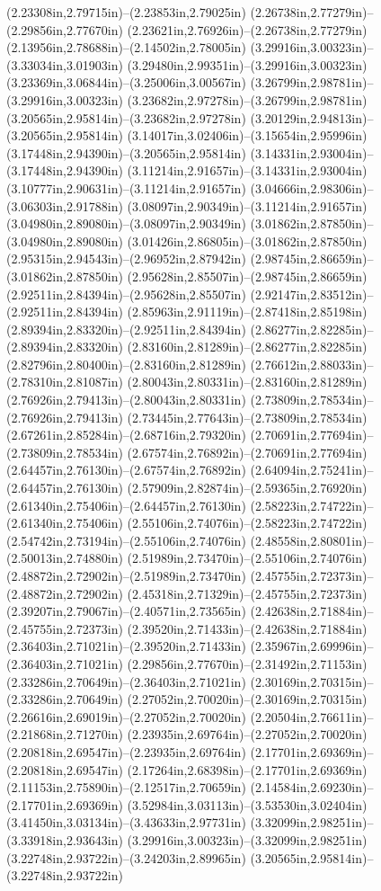 (2.23308in,2.79715in)--(2.23853in,2.79025in) (2.26738in,2.77279in)--(2.29856in,2.77670in) (2.23621in,2.76926in)--(2.26738in,2.77279in) (2.13956in,2.78688in)--(2.14502in,2.78005in) (3.29916in,3.00323in)--(3.33034in,3.01903in) (3.29480in,2.99351in)--(3.29916in,3.00323in) (3.23369in,3.06844in)--(3.25006in,3.00567in) (3.26799in,2.98781in)--(3.29916in,3.00323in) (3.23682in,2.97278in)--(3.26799in,2.98781in) (3.20565in,2.95814in)--(3.23682in,2.97278in) (3.20129in,2.94813in)--(3.20565in,2.95814in) (3.14017in,3.02406in)--(3.15654in,2.95996in) (3.17448in,2.94390in)--(3.20565in,2.95814in) (3.14331in,2.93004in)--(3.17448in,2.94390in) (3.11214in,2.91657in)--(3.14331in,2.93004in) (3.10777in,2.90631in)--(3.11214in,2.91657in) (3.04666in,2.98306in)--(3.06303in,2.91788in) (3.08097in,2.90349in)--(3.11214in,2.91657in) (3.04980in,2.89080in)--(3.08097in,2.90349in) (3.01862in,2.87850in)--(3.04980in,2.89080in) (3.01426in,2.86805in)--(3.01862in,2.87850in) (2.95315in,2.94543in)--(2.96952in,2.87942in) (2.98745in,2.86659in)--(3.01862in,2.87850in) (2.95628in,2.85507in)--(2.98745in,2.86659in) (2.92511in,2.84394in)--(2.95628in,2.85507in) (2.92147in,2.83512in)--(2.92511in,2.84394in) (2.85963in,2.91119in)--(2.87418in,2.85198in) (2.89394in,2.83320in)--(2.92511in,2.84394in) (2.86277in,2.82285in)--(2.89394in,2.83320in) (2.83160in,2.81289in)--(2.86277in,2.82285in) (2.82796in,2.80400in)--(2.83160in,2.81289in) (2.76612in,2.88033in)--(2.78310in,2.81087in) (2.80043in,2.80331in)--(2.83160in,2.81289in) (2.76926in,2.79413in)--(2.80043in,2.80331in) (2.73809in,2.78534in)--(2.76926in,2.79413in) (2.73445in,2.77643in)--(2.73809in,2.78534in) (2.67261in,2.85284in)--(2.68716in,2.79320in) (2.70691in,2.77694in)--(2.73809in,2.78534in) (2.67574in,2.76892in)--(2.70691in,2.77694in) (2.64457in,2.76130in)--(2.67574in,2.76892in) (2.64094in,2.75241in)--(2.64457in,2.76130in) (2.57909in,2.82874in)--(2.59365in,2.76920in) (2.61340in,2.75406in)--(2.64457in,2.76130in) (2.58223in,2.74722in)--(2.61340in,2.75406in) (2.55106in,2.74076in)--(2.58223in,2.74722in) (2.54742in,2.73194in)--(2.55106in,2.74076in) (2.48558in,2.80801in)--(2.50013in,2.74880in) (2.51989in,2.73470in)--(2.55106in,2.74076in) (2.48872in,2.72902in)--(2.51989in,2.73470in) (2.45755in,2.72373in)--(2.48872in,2.72902in) (2.45318in,2.71329in)--(2.45755in,2.72373in) (2.39207in,2.79067in)--(2.40571in,2.73565in) (2.42638in,2.71884in)--(2.45755in,2.72373in) (2.39520in,2.71433in)--(2.42638in,2.71884in) (2.36403in,2.71021in)--(2.39520in,2.71433in) (2.35967in,2.69996in)--(2.36403in,2.71021in) (2.29856in,2.77670in)--(2.31492in,2.71153in) (2.33286in,2.70649in)--(2.36403in,2.71021in) (2.30169in,2.70315in)--(2.33286in,2.70649in) (2.27052in,2.70020in)--(2.30169in,2.70315in) (2.26616in,2.69019in)--(2.27052in,2.70020in) (2.20504in,2.76611in)--(2.21868in,2.71270in) (2.23935in,2.69764in)--(2.27052in,2.70020in) (2.20818in,2.69547in)--(2.23935in,2.69764in) (2.17701in,2.69369in)--(2.20818in,2.69547in) (2.17264in,2.68398in)--(2.17701in,2.69369in) (2.11153in,2.75890in)--(2.12517in,2.70659in) (2.14584in,2.69230in)--(2.17701in,2.69369in) (3.52984in,3.03113in)--(3.53530in,3.02404in) (3.41450in,3.03134in)--(3.43633in,2.97731in) (3.32099in,2.98251in)--(3.33918in,2.93643in) (3.29916in,3.00323in)--(3.32099in,2.98251in) (3.22748in,2.93722in)--(3.24203in,2.89965in) (3.20565in,2.95814in)--(3.22748in,2.93722in) 
